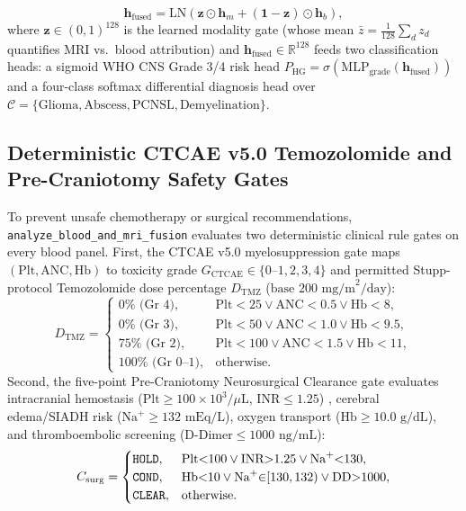 \documentclass[journal,onecolumn,10pt]{IEEEtran}
\begin{document}
\begin{equation}
    \mathbf{h}_{\text{fused}} = \text{LN}\!\left(\mathbf{z} \odot \mathbf{h}_m + (\mathbf{1} - \mathbf{z}) \odot \mathbf{h}_b\right),
    \label{eq:gmu_fused}
\end{equation}
where $\mathbf{z} \in (0,1)^{128}$ is the learned modality gate (whose mean $\bar{z} = \frac{1}{128}\sum_d z_d$ quantifies MRI vs.\ blood attribution) and $\mathbf{h}_{\text{fused}} \in \mathbb{R}^{128}$ feeds two classification heads: a sigmoid WHO CNS Grade 3/4 risk head $P_{\text{HG}} = \sigma(\text{MLP}_{\text{grade}}(\mathbf{h}_{\text{fused}}))$ and a four-class softmax differential diagnosis head over $\mathcal{C} = \{\text{Glioma}, \text{Abscess}, \text{PCNSL}, \text{Demyelination}\}$.

\subsection{Deterministic CTCAE v5.0 Temozolomide and Pre-Craniotomy Safety Gates}
To prevent unsafe chemotherapy or surgical recommendations, \texttt{analyze\_blood\_and\_mri\_fusion} evaluates two deterministic clinical rule gates on every blood panel. First, the CTCAE v5.0 myelosuppression gate \cite{stupp2005radiotherapy, ctcae2017v5} maps $(\text{Plt}, \text{ANC}, \text{Hb})$ to toxicity grade $G_{\text{CTCAE}} \in \{0\text{--}1, 2, 3, 4\}$ and permitted Stupp-protocol Temozolomide dose percentage $D_{\text{TMZ}}$ ($\text{base } 200\text{ mg/m}^2/\text{day}$):
\begin{equation}
    D_{\text{TMZ}} = \begin{cases}
    0\%\text{ (Gr 4)}, & \text{Plt}{<}25 \lor \text{ANC}{<}0.5 \lor \text{Hb}{<}8, \\
    0\%\text{ (Gr 3)}, & \text{Plt}{<}50 \lor \text{ANC}{<}1.0 \lor \text{Hb}{<}9.5, \\
    75\%\text{ (Gr 2)}, & \text{Plt}{<}100 \lor \text{ANC}{<}1.5 \lor \text{Hb}{<}11, \\
    100\%\text{ (Gr 0--1)}, & \text{otherwise}.
    \end{cases}
    \label{eq:ctcae_gate}
\end{equation}
Second, the five-point Pre-Craniotomy Neurosurgical Clearance gate evaluates intracranial hemostasis ($\text{Plt} \ge 100 \times 10^3/\mu\text{L}$, $\text{INR} \le 1.25$) \cite{lichaos2015platelet}, cerebral edema/SIADH risk ($\text{Na}^+ \ge 132\text{ mEq/L}$), oxygen transport ($\text{Hb} \ge 10.0\text{ g/dL}$), and thromboembolic screening ($\text{D-Dimer} \le 1000\text{ ng/mL}$):
\begin{equation}
    C_{\text{surg}} = \begin{cases}
    \text{\texttt{HOLD}}, & \text{Plt}{<}100 \lor \text{INR}{>}1.25 \lor \text{Na}^+{<}130, \\
    \text{\texttt{COND}}, & \text{Hb}{<}10 \lor \text{Na}^+{\in}[130,132) \lor \text{DD}{>}1000, \\
    \text{\texttt{CLEAR}}, & \text{otherwise}.
    \end{cases}
    \label{eq:surg_gate}
\end{equation}
\end{document}
